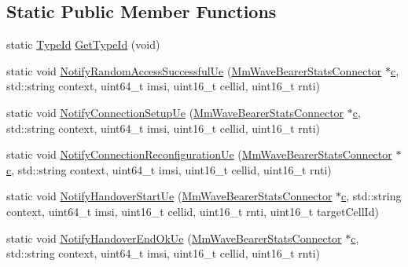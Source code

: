 \subsection*{Static Public Member Functions}
\begin{DoxyCompactItemize}
\item 
static \hyperlink{classns3_1_1TypeId}{Type\+Id} \hyperlink{classns3_1_1MmWaveBearerStatsConnector_a84b66486e558c31e1791d7a157d67999}{Get\+Type\+Id} (void)
\item 
static void \hyperlink{classns3_1_1MmWaveBearerStatsConnector_af8b77855f80cb2735024e101e705d67f}{Notify\+Random\+Access\+Successful\+Ue} (\hyperlink{classns3_1_1MmWaveBearerStatsConnector}{Mm\+Wave\+Bearer\+Stats\+Connector} $\ast$\hyperlink{mmwave_2model_2fading-traces_2fading__trace__generator_8m_ae0323a9039add2978bf5b49550572c7c}{c}, std\+::string context, uint64\+\_\+t imsi, uint16\+\_\+t cellid, uint16\+\_\+t rnti)
\item 
static void \hyperlink{classns3_1_1MmWaveBearerStatsConnector_a6b8ee4cba12dd076ee258688ea5e077d}{Notify\+Connection\+Setup\+Ue} (\hyperlink{classns3_1_1MmWaveBearerStatsConnector}{Mm\+Wave\+Bearer\+Stats\+Connector} $\ast$\hyperlink{mmwave_2model_2fading-traces_2fading__trace__generator_8m_ae0323a9039add2978bf5b49550572c7c}{c}, std\+::string context, uint64\+\_\+t imsi, uint16\+\_\+t cellid, uint16\+\_\+t rnti)
\item 
static void \hyperlink{classns3_1_1MmWaveBearerStatsConnector_aca34f8d00bf86a9974663c869573e6af}{Notify\+Connection\+Reconfiguration\+Ue} (\hyperlink{classns3_1_1MmWaveBearerStatsConnector}{Mm\+Wave\+Bearer\+Stats\+Connector} $\ast$\hyperlink{mmwave_2model_2fading-traces_2fading__trace__generator_8m_ae0323a9039add2978bf5b49550572c7c}{c}, std\+::string context, uint64\+\_\+t imsi, uint16\+\_\+t cellid, uint16\+\_\+t rnti)
\item 
static void \hyperlink{classns3_1_1MmWaveBearerStatsConnector_a256d437bf2591e6bd5a1b544969fd6f9}{Notify\+Handover\+Start\+Ue} (\hyperlink{classns3_1_1MmWaveBearerStatsConnector}{Mm\+Wave\+Bearer\+Stats\+Connector} $\ast$\hyperlink{mmwave_2model_2fading-traces_2fading__trace__generator_8m_ae0323a9039add2978bf5b49550572c7c}{c}, std\+::string context, uint64\+\_\+t imsi, uint16\+\_\+t cellid, uint16\+\_\+t rnti, uint16\+\_\+t target\+Cell\+Id)
\item 
static void \hyperlink{classns3_1_1MmWaveBearerStatsConnector_a8508fad62fbd6421001c7092ca96edbf}{Notify\+Handover\+End\+Ok\+Ue} (\hyperlink{classns3_1_1MmWaveBearerStatsConnector}{Mm\+Wave\+Bearer\+Stats\+Connector} $\ast$\hyperlink{mmwave_2model_2fading-traces_2fading__trace__generator_8m_ae0323a9039add2978bf5b49550572c7c}{c}, std\+::string context, uint64\+\_\+t imsi, uint16\+\_\+t cellid, uint16\+\_\+t rnti)

\end{DoxyCompactItemize}
